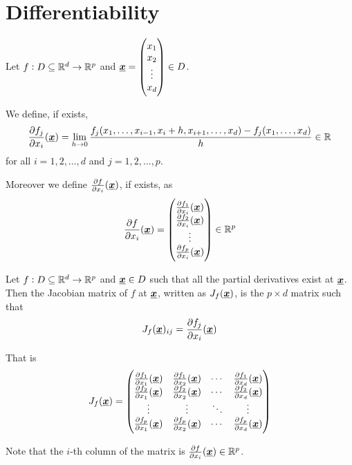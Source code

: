 \documentclass[12pt]{extarticle}
\renewcommand{\vec}[1]{\uvec{#1}}
\begin{document}
\section{Differentiability}

\begin{definition}
    Let $f: D \subseteq \mathbb{R}^d \to \mathbb{R}^p$ and $\vec{x} = \begin{pmatrix} x_1 \\ x_2 \\ \vdots \\ x_d \end{pmatrix} \in D$.

    We define, if exists,
    \begin{equation}
        \pdv{f_j}{x_i}\/(\vec{x}) = \lim_{h \to 0} \frac{f_j(x_1, \ldots, x_{i-1}, x_i + h, x_{i+1}, \ldots, x_d) - f_j(x_1, \ldots, x_d)}{h} \in \R
    \end{equation}
    for all $i = 1, 2, \ldots, d$ and $j = 1, 2, \ldots, p$.

    Moreover we define $\pdv{f}{x_i}\/(\vec{x})$, if exists, as
    \begin{equation}
        \pdv{f}{x_i}\/(\vec{x}) = \begin{pmatrix}
            \pdv{f_1}{x_i}\/(\vec{x}) \\
            \pdv{f_2}{x_i}\/(\vec{x}) \\
            \vdots                    \\
            \pdv{f_p}{x_i}\/(\vec{x})
        \end{pmatrix} \in \R^p
    \end{equation}
\end{definition}

\begin{definition}
    Let $f: D \subseteq \mathbb{R}^d \to \mathbb{R}^p$ and $\vec{x} \in D$ such that all the partial derivatives exist at $\vec{x}$.
    Then the Jacobian matrix of $f$ at $\vec{x}$, written as $J_f(\vec{x})$, is the $p \times d$ matrix such that
    \begin{equation}
        J_f(\vec{x})_{ij} = \pdv{f_j}{x_i}\/(\vec{x})
    \end{equation}

    That is
    \begin{equation}
        J_f(\vec{x}) = \begin{pmatrix}
            \pdv{f_1}{x_1}\/(\vec{x}) & \pdv{f_1}{x_2}\/(\vec{x}) & \cdots & \pdv{f_1}{x_d}\/(\vec{x}) \\
            \pdv{f_2}{x_1}\/(\vec{x}) & \pdv{f_2}{x_2}\/(\vec{x}) & \cdots & \pdv{f_2}{x_d}\/(\vec{x}) \\
            \vdots                    & \vdots                    & \ddots & \vdots                    \\
            \pdv{f_p}{x_1}\/(\vec{x}) & \pdv{f_p}{x_2}\/(\vec{x}) & \cdots & \pdv{f_p}{x_d}\/(\vec{x})
        \end{pmatrix}
    \end{equation}

    Note that the $i$-th column of the matrix is $\pdv{f}{x_i}\/(\vec{x}) \in \R^p$.
\end{definition}
\end{document}
